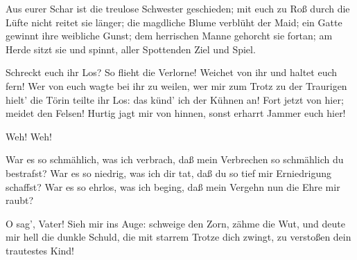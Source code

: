 \begin{drama}
Aus eurer Schar ist die treulose Schwester geschieden;
mit euch zu Roß durch die Lüfte nicht reitet sie länger;
die magdliche Blume verblüht der Maid;
ein Gatte gewinnt ihre weibliche Gunst;
dem herrischen Manne gehorcht sie fortan;
am Herde sitzt sie und spinnt,
aller Spottenden Ziel und Spiel.
 




Schreckt euch ihr Los? So flieht die Verlorne!
Weichet von ihr und haltet euch fern!
Wer von euch wagte bei ihr zu weilen,
wer mir zum Trotz
zu der Traurigen hielt'
die Törin teilte ihr Los:
das künd' ich der Kühnen an!
Fort jetzt von hier; meidet den Felsen!
Hurtig jagt mir von hinnen,
sonst erharrt Jammer euch hier!
 


Weh! Weh!
 



\scene



\Brunnhildespeaks


War es so schmählich, was ich verbrach,
daß mein Verbrechen so schmählich du bestrafst?
War es so niedrig, was ich dir tat,
daß du so tief mir Erniedrigung schaffst?
War es so ehrlos, was ich beging,
daß mein Vergehn nun die Ehre mir raubt?



O sag', Vater! Sieh mir ins Auge:
schweige den Zorn, zähme die Wut,
und deute mir hell die dunkle Schuld,
die mit starrem Trotze dich zwingt,
zu verstoßen dein trautestes Kind!
 


\end{drama}
